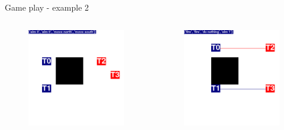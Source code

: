 \documentclass{beamer}
\begin{document}
\begin{frame}{Game play - example 2}
\begin{columns}
\begin{figure}[htp]
  \centering
  \includegraphics[width=\textwidth]{images/iteration/screenshot02.png}
\end{figure}
\begin{figure}[htp]
  \centering
  \includegraphics[width=\textwidth]{images/iteration/screenshot05.png}
\end{figure}


\end{columns}
\end{frame}
\end{document}
